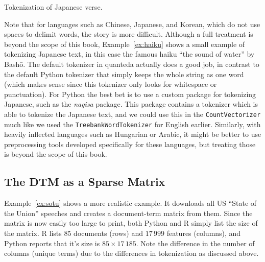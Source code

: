 \begin{ccsexample}
  \begin{tcbraster}[raster columns=2,raster equal height=rows,raster valign=top]
  \begin{tcolorbox}[title=Python Output]
      \texttt{[image: \{chapter10/haiku.py]}.png}
  \end{tcolorbox}%
  \begin{tcolorbox}[title=R Output]
      \texttt{[image: \{chapter10/haiku.r]}.png}
  \end{tcolorbox}%
\end{tcbraster}
  \caption{Tokenization of Japanese verse.}\label{ex:haiku}
\end{ccsexample}



Note that for languages such as Chinese, Japanese, and Korean, which do not use spaces to delimit words, the story is more difficult.
Although a full treatment is beyond the scope of this book, Example~\ref{ex:haiku} shows a small example of tokenizing Japanese text,
in this case the famous haiku ``the sound of water'' by Bash\={o}.
The default tokenizer in quanteda actually does a good job, in contrast to the default Python tokenizer
that simply keeps the whole string as one word
(which makes sense since this tokenizer only looks for whitespace or punctuation).
For Python the best bet is to use a custom package for tokenizing Japanese, such as the \emph{nagisa} package.
This package contains a tokenizer which is able to tokenize the Japanese text, and we could use this in the \texttt{CountVectorizer}
much like we used the \texttt{TreebankWordTokenizer} for English earlier.
Similarly, with heavily inflected languages such as Hungarian or Arabic,
it might be better to use preprocessing tools developed specifically for these languages, but treating those is
beyond the scope of this book.


\subsection{The DTM as a Sparse Matrix}


Example~\ref{ex:sotu} shows a more realistic example.
It downloads all US ``State of the Union'' speeches and creates a document-term matrix from them.
Since the matrix is now easily too large to print, both Python and R simply list the size of the matrix.
R lists $85$ documents (rows) and $17\,999$ features (columns), and Python reports that it's size is $85\times17\,185$.
Note the difference in the number of columns (unique terms) due to the differences in tokenization as discussed above.


